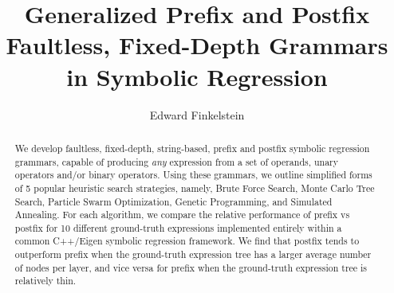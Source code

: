 \documentclass[runningheads]{llncs}
\begin{document}
%
\title{Generalized Prefix and Postfix Faultless, Fixed-Depth Grammars in Symbolic Regression}%
%
%
\author{Edward Finkelstein\orcidID{}}
%
%
%
\maketitle              %
%
\begin{abstract}
We develop faultless, fixed-depth, string-based, prefix and postfix symbolic regression grammars, capable of producing \emph{any} expression from a set of operands, unary operators and/or binary operators. Using these grammars, we outline simplified forms of 5 popular heuristic search strategies, namely, Brute Force Search,  Monte Carlo Tree Search, Particle Swarm Optimization, Genetic Programming, and Simulated Annealing. For each algorithm, we compare the relative performance of prefix vs postfix for 10 different ground-truth expressions implemented entirely within a common C++/Eigen symbolic regression framework. We find that postfix tends to outperform prefix when the ground-truth expression tree has a larger average number of nodes per layer, and vice versa for prefix when the ground-truth expression tree is relatively thin.

\end{abstract}
\end{document}

